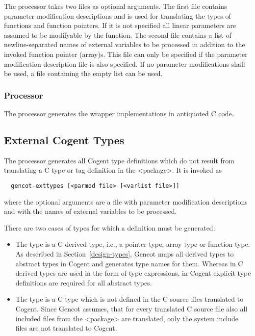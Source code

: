 The processor takes two files as optional arguments. The first file contains parameter modification descriptions
and is used for translating the types of functions and function pointers. If it is not specified all linear
parameters are assumed to be modifyable by the function. The second file contains a list of newline-separated 
names of external variables to be processed in addition to the invoked function pointer (array)s. This file can
only be specified if the parameter modification description file is also specified. If no parameter modifications
shall be used, a file containing the empty list \code{[]} can be used.

\subsubsection{Processor }

The processor  generates the wrapper implementations in antiquoted C code.

\subsection{External Cogent Types}
\label{impl-ccomps-exttypes}

The processor  generates all Cogent type definitions which do not result from
translating a C type or tag definition in the <package>. It is invoked as
\begin{verbatim}
  gencot-exttypes [<parmod file> [<varlist file>]]
\end{verbatim}
where the optional arguments are a file with parameter modification descriptions and with the names of external
variables to be processed.

There are two cases of types for which a definition must be generated:
\begin{itemize}
\item The type is a C derived type, i.e., a pointer type, array type or function type. As described in 
Section~\ref{design-types}, Gencot maps all derived types to abstract types in Cogent and generates type names for
them. Whereas in C derived types are used in the form of type expressions, in Cogent explicit type definitions are
required for all abstract types.
\item The type is a C type which is not defined in the C source files translated to Cogent. Since Gencot assumes, that 
for every translated C source file also all included files from the <package> are translated, only the system 
include files are not translated to Cogent. 
\end{itemize}


